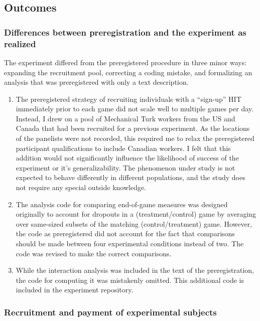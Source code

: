 \documentclass{article}
\begin{document}
\subsection{Outcomes}
\label{outcomes}

\subsubsection{Differences between preregistration and the experiment as realized}
The experiment differed from the preregistered procedure in three minor ways: expanding the recruitment pool, correcting a coding mistake, and formalizing an analysis that was preregistered with only a text description.

\begin{enumerate}
    \item The preregistered strategy of recruiting individuals with a “sign-up” HIT immediately prior to each game did not scale well to multiple games per day. Instead, I drew on a pool of Mechanical Turk workers from the US and Canada that had been recruited for a previous experiment. As the locations of the panelists were not recorded, this required me to relax the preregistered participant qualifications to include Canadian workers. I felt that this addition would not significantly influence the likelihood of success of the experiment or it’s generalizability. The phenomenon under study is not expected to behave differently in different populations, and the study does not require any special outside knowledge.
    
    \item The analysis code for comparing end-of-game measures was designed originally to account for dropouts in a (treatment/control) game by averaging over same-sized subsets of the matching (control/treatment) game. However, the code as preregistered did not account for the fact that comparisons should be made between four experimental conditions instead of two. The code was revised to make the correct comparisons.
    
    \item While the interaction analysis was included in the text of the preregistration, the code for computing it was mistakenly omitted. This additional code is included in the experiment repository.

\end{enumerate}




\subsubsection{Recruitment and payment of experimental subjects}
\end{document}
